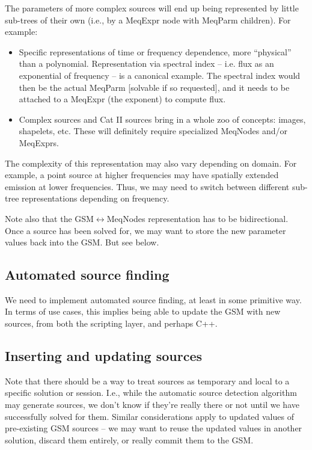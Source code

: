 \documentclass[]{lofar}
\begin{document}
  The parameters of more complex sources will end up being represented by
  little sub-trees of their own (i.e., by a MeqExpr node with MeqParm
  children). For example:

  \begin{itemize}
  
  \item Specific representations of time or frequency dependence, more
  ``physical'' than a polynomial. Representation via spectral index -- i.e.
  flux as an exponential of frequency -- is a canonical example. The spectral
  index would then be the actual MeqParm [solvable if so requested], and it
  needs to be attached to a MeqExpr (the exponent) to compute flux.

  \item Complex sources and Cat II sources bring in a whole zoo of concepts:
  images, shapelets, etc. These will definitely require specialized MeqNodes
  and/or MeqExprs. 
  
  \end{itemize}
  
  The complexity of this representation may also vary depending on domain. For
  example, a point source at higher frequencies may have spatially extended
  emission at lower frequencies. Thus, we may need to switch between different
  sub-tree representations depending on frequency.

  Note also that the GSM$\leftrightarrow$MeqNodes representation has to be
  bidirectional. Once a source has been solved for, we may want to store the
  new parameter values back into the GSM. But see below.

\subsection{Automated source finding}
  
  We need to implement automated source finding, at least in some primitive
  way.  In terms of use cases, this implies being able to update the GSM with
  new sources, from both the scripting layer, and perhaps C++. 

\subsection{Inserting and updating sources}
  
  Note that there should be a way to treat sources as temporary and local to a
  specific solution or session. I.e., while the automatic source detection
  algorithm may generate sources, we don't know if they're really there or not
  until we have successfully solved for them. Similar considerations apply to
  updated values of pre-existing GSM sources -- we may want to reuse the
  updated values in another solution, discard them entirely, or really commit
  them to the GSM.
\end{document}
